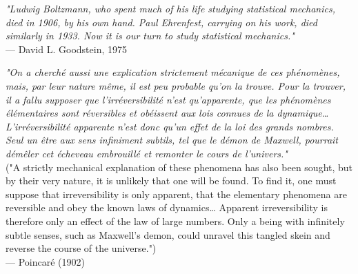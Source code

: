 \begin{flushright}
\emph{"Ludwig Boltzmann, who spent much of his life studying statistical mechanics, died in 1906, by his own hand. Paul Ehrenfest, carrying on his work, died similarly in 1933. Now it is our turn to study statistical mechanics."}\\
 — David L. Goodstein, 1975
\end{flushright}
\vspace{2em}
\begin{flushright}
\emph{"On a cherché aussi une explication strictement mécanique de ces phénomènes, mais, par leur nature même, il est peu probable qu’on la trouve. Pour la trouver, il a fallu supposer que l’irréversibilité n’est qu’apparente, que les phénomènes élémentaires sont réversibles et obéissent aux lois connues de la dynamique… L’irréversibilité apparente n’est donc qu’un effet de la loi des grands nombres. Seul un être aux sens infiniment subtils, tel que le démon de Maxwell, pourrait démêler cet écheveau embrouillé et remonter le cours de l’univers."} \\  
("A strictly mechanical explanation of these phenomena has also been sought, but by their very nature, it is unlikely that one will be found. To find it, one must suppose that irreversibility is only apparent, that the elementary phenomena are reversible and obey the known laws of dynamics… Apparent irreversibility is therefore only an effect of the law of large numbers. Only a being with infinitely subtle senses, such as Maxwell’s demon, could unravel this tangled skein and reverse the course of the universe.") \\
 — Poincaré (1902)
\end{flushright}
